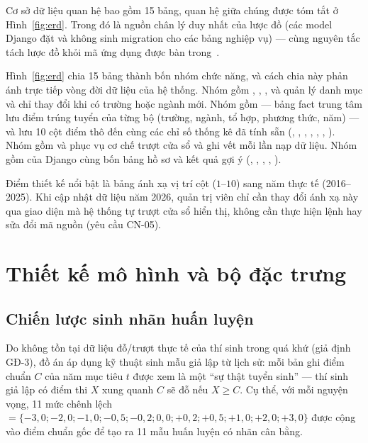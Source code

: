 Cơ sở dữ liệu quan hệ  bao gồm 15 bảng, quan hệ giữa chúng được
tóm tắt ở Hình~\ref{fig:erd}. Trong đó  là nguồn chân lý duy
nhất của lược đồ (các model Django đặt  và không sinh
migration cho các bảng nghiệp vụ) --- cùng nguyên tắc tách lược đồ khỏi mã ứng
dụng được bàn trong~\cite{Fowler2002}.

Hình~\ref{fig:erd} chia 15 bảng thành bốn nhóm chức năng, và cách chia này phản
ánh trực tiếp vòng đời dữ liệu của hệ thống. Nhóm  gồm
, , ,  và  quản
lý danh mục và chỉ thay đổi khi có trường hoặc ngành mới. Nhóm  gồm
 --- bảng fact trung tâm lưu điểm trúng tuyển của từng bộ
(trường, ngành, tổ hợp, phương thức, năm) --- và  lưu
10 cột điểm thô  đến  cùng các chỉ số thống
kê đã tính sẵn (, , ,
, , , ).
Nhóm  gồm  và  phục vụ cơ chế
trượt cửa sổ và ghi vết mỗi lần nạp dữ liệu. Nhóm  gồm
 của Django cùng bốn bảng hồ sơ và kết quả gợi ý
(, , ,
, ).

Điểm thiết kế nổi bật là bảng  ánh xạ vị trí cột ($1$--$10$) sang năm thực tế (2016--2025). Khi cập nhật dữ liệu năm 2026, quản trị viên chỉ cần thay đổi ánh xạ này qua giao diện mà hệ thống tự trượt cửa sổ hiển thị, không cần thực hiện lệnh  hay sửa đổi mã nguồn (yêu cầu CN-05).

\section{Thiết kế mô hình và bộ đặc trưng}

\subsection{Chiến lược sinh nhãn huấn luyện}

Do không tồn tại dữ liệu đỗ/trượt thực tế của thí sinh trong quá khứ (giả định GĐ-3), đồ án áp dụng kỹ thuật sinh mẫu giả lập từ lịch sử: mỗi bản ghi điểm chuẩn $C$ của năm mục tiêu $t$ được xem là một ``sự thật tuyển sinh'' --- thí sinh giả lập có điểm thi $X$ xung quanh $C$ sẽ đỗ nếu $X \ge C$. Cụ thể, với mỗi nguyện vọng, 11 mức chênh lệch  $= \{-3{,}0; -2{,}0; -1{,}0; -0{,}5; -0{,}2; 0{,}0; +0{,}2; +0{,}5; +1{,}0; +2{,}0; +3{,}0\}$ được cộng vào điểm chuẩn gốc để tạo ra 11 mẫu huấn luyện có nhãn cân bằng.

